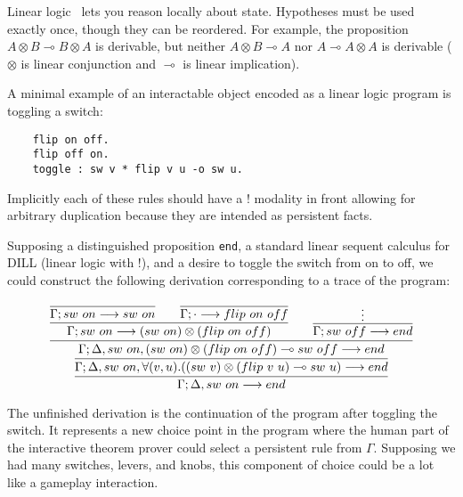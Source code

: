 \newcommand{\lolli}{\multimap}

Linear logic~\cite{Girard87} lets you reason locally about state. Hypotheses must be used
exactly once, though they can be reordered. For example, the proposition $A
\otimes B \lolli B \otimes A$ is derivable, but neither $A \otimes B \lolli
A$ nor $A \lolli A \otimes A$ is derivable ($\otimes$ is linear
conjunction and $\lolli$ is linear implication).

A minimal example of an interactable object encoded as a linear logic
program is toggling a switch:

\begin{verbatim}
    flip on off.
    flip off on.
    toggle : sw v * flip v u -o sw u.
\end{verbatim}

Implicitly each of these rules should have a $!$ modality in front allowing
for arbitrary duplication because they are intended as persistent facts.

Supposing a distinguished proposition \verb|end|, a standard linear sequent
calculus for DILL (linear logic with $!$), and a desire to toggle the
switch from on to off, we could construct the following derivation
corresponding to a trace of the program:

{\small
\[
\infer
{
  \Gamma; \Delta, sw\ on \longrightarrow end
}
{
  \infer
  {
    \Gamma; \Delta, sw\ on, \forall(v,u).((sw\ v)\otimes (flip\ v\
    u)\multimap sw\ u)
    \longrightarrow end
  }
  {
  \infer
    {
    \Gamma; \Delta, sw\ on, (sw\ on)\otimes (flip\ on\ off)\multimap sw\
    off
    \longrightarrow end
    }
    {
        \infer{
          \Gamma; sw\ on \longrightarrow (sw\ on)\otimes(flip\ on\ off)
          }
          {
            \infer
            {\Gamma; sw\ on \longrightarrow sw\ on}
            {}
            \qquad
            \infer
            {\Gamma; \cdot \longrightarrow flip\ on\ off}
            {}
          }
        \qquad
        \infer{
          \Gamma; sw\ off \longrightarrow end
          }
          {\vdots
          }
    }
  }
}
\]
}

The unfinished derivation is the continuation of the program after toggling
the switch. It represents a new choice point in the program where the human
part of the interactive theorem prover could select a persistent rule from
$\Gamma$.  Supposing we had many switches, levers, and knobs, this
component of choice could be a lot like a gameplay interaction.



% 
